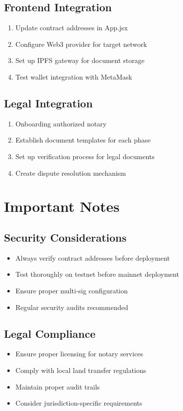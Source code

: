 \documentclass[12pt,a4paper]{article}
\begin{document}
\subsection{Frontend Integration}
\begin{enumerate}
\item Update contract addresses in App.jsx
\item Configure Web3 provider for target network
\item Set up IPFS gateway for document storage
\item Test wallet integration with MetaMask
\end{enumerate}

\subsection{Legal Integration}
\begin{enumerate}
\item Onboarding authorized notary
\item Establish document templates for each phase
\item Set up verification process for legal documents
\item Create dispute resolution mechanism
\end{enumerate}

\section{Important Notes}

\subsection{Security Considerations}
\begin{itemize}
\item Always verify contract addresses before deployment
\item Test thoroughly on testnet before mainnet deployment
\item Ensure proper multi-sig configuration
\item Regular security audits recommended
\end{itemize}

\subsection{Legal Compliance}
\begin{itemize}
\item Ensure proper licensing for notary services
\item Comply with local land transfer regulations
\item Maintain proper audit trails
\item Consider jurisdiction-specific requirements
\end{itemize}
\end{document}
